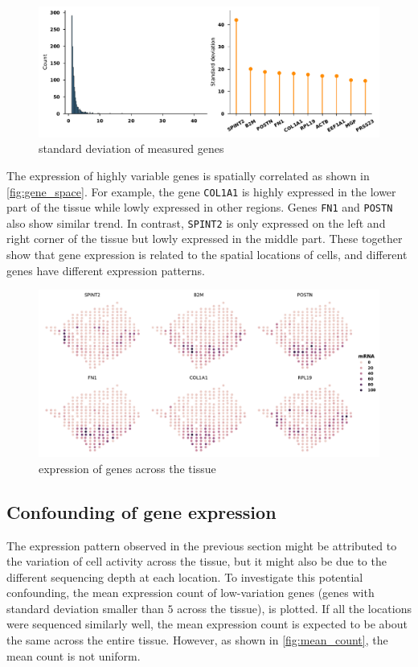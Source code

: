 \documentclass[11pt,oneside]{article}
\begin{document}
\begin{figure}[ht]
\centering
\includegraphics[width=.8\textwidth]{1gene_std.pdf}
\caption{standard deviation of measured  genes}\label{fig:std_genes}
\end{figure}

The expression of highly variable genes is spatially correlated as shown in \autoref{fig:gene_space}. For example, the gene \texttt{COL1A1} is highly expressed in the lower part of the tissue while lowly expressed in other regions. Genes \texttt{FN1} and \texttt{POSTN} also show similar trend. In contrast, \texttt{SPINT2} is only expressed on the left and right corner of the tissue but lowly expressed in the middle part. These together show that gene expression is related to the spatial locations of cells, and different genes have different expression patterns.

\begin{figure}[ht]
\centering
\includegraphics[width=.9\textwidth]{1gene_space.pdf}
\caption{expression of genes across the tissue}
\label{fig:gene_space}
\end{figure}

\subsection{Confounding of gene expression}

The expression pattern observed in the previous section might be attributed to the variation of cell activity across the tissue, but it might also be due to the different sequencing depth at each location. To investigate this potential confounding, the mean expression count of low-variation genes (genes with standard deviation smaller than $5$ across the tissue), is plotted. If all the locations were sequenced similarly well, the mean expression count is expected to be about the same across the entire tissue. However, as shown in \autoref{fig:mean_count}, the mean count is not uniform.
\end{document}
